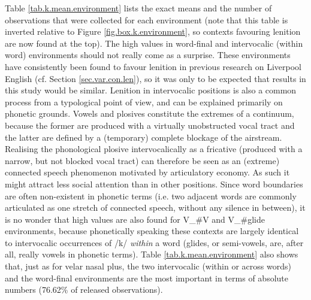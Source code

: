 Table \ref{tab.k.mean.environment} lists the exact means and the number of observations that were collected for each environment (note that this table is inverted relative to Figure \ref{fig.box.k.environment}, so contexts favouring lenition are now found at the top).
The high  values in word-final and intervocalic (within word) environments should not really come as a surprise.
These environments have consistently been found to favour lenition in previous research on Liverpool English (cf. Section \ref{sec.var.con.len}), so it was only to be expected that results in this study would be similar.
Lenition in intervocalic positions is also a common process from a typological point of view, and can be explained primarily on phonetic grounds. 
Vowels and plosives constitute the extremes of a continuum, because the former are produced with a virtually unobstructed vocal tract and the latter are defined by a (temporary) complete blockage of the airstream.
Realising the phonological plosive intervocalically as a fricative (produced with a narrow, but not blocked vocal tract) can therefore be seen as an (extreme) connected speech phenomenon motivated by articulatory economy.
As such it might attract less social attention than in other positions.
Since word boundaries are often non-existent in phonetic terms (i.e. two adjacent words are commonly articulated as one stretch of connected speech, without any silence in between), it is no wonder that high  values are also found for V\_\#V and V\_\#glide environments, because phonetically speaking these contexts are largely identical to intervocalic occurrences of /k/ \emph{within} a word (glides, or semi-vowels, are, after all, really vowels in phonetic terms).
Table \ref{tab.k.mean.environment} also shows that, just as for velar nasal plus, the two intervocalic (within or across words) and the word-final environments are the most important in terms of absolute numbers (76.62\% of released observations).


